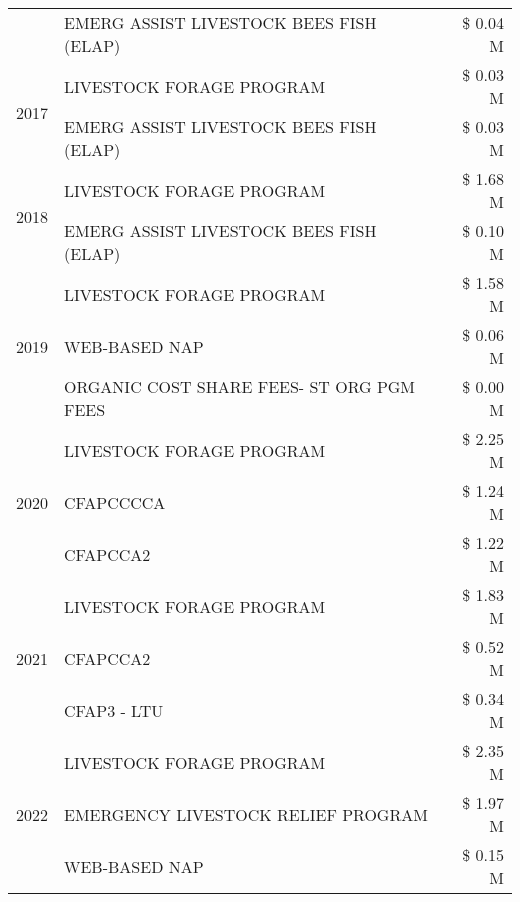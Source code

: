 \begin{tabular}{llr}
 & EMERG ASSIST LIVESTOCK BEES FISH (ELAP) & \$ 0.04 M \\
\cline{1-3}
\multirow[t]{2}{*}{2017} & LIVESTOCK FORAGE PROGRAM & \$ 0.03 M \\
 & EMERG ASSIST LIVESTOCK BEES FISH (ELAP) & \$ 0.03 M \\
\cline{1-3}
\multirow[t]{2}{*}{2018} & LIVESTOCK FORAGE PROGRAM & \$ 1.68 M \\
 & EMERG ASSIST LIVESTOCK BEES FISH (ELAP) & \$ 0.10 M \\
\cline{1-3}
\multirow[t]{3}{*}{2019} & LIVESTOCK FORAGE PROGRAM & \$ 1.58 M \\
 & WEB-BASED NAP & \$ 0.06 M \\
 & ORGANIC COST SHARE FEES- ST ORG PGM FEES & \$ 0.00 M \\
\cline{1-3}
\multirow[t]{3}{*}{2020} & LIVESTOCK FORAGE PROGRAM & \$ 2.25 M \\
 & CFAPCCCCA & \$ 1.24 M \\
 & CFAPCCA2 & \$ 1.22 M \\
\cline{1-3}
\multirow[t]{3}{*}{2021} & LIVESTOCK FORAGE PROGRAM & \$ 1.83 M \\
 & CFAPCCA2 & \$ 0.52 M \\
 & CFAP3 - LTU & \$ 0.34 M \\
\cline{1-3}
\multirow[t]{3}{*}{2022} & LIVESTOCK FORAGE PROGRAM & \$ 2.35 M \\
 & EMERGENCY LIVESTOCK RELIEF PROGRAM & \$ 1.97 M \\
 & WEB-BASED NAP & \$ 0.15 M \\
\cline{1-3}
\bottomrule
\end{tabular}
